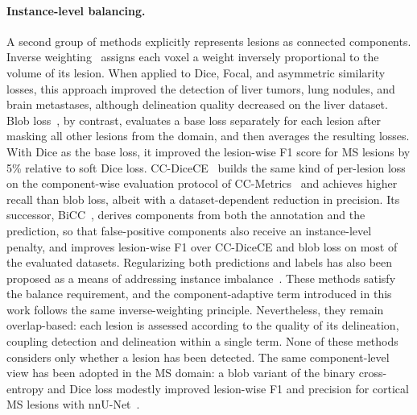 \paragraph{Instance-level balancing.}
A second group of methods explicitly represents lesions as connected
components. Inverse weighting~\cite{shirokikh_universal_2020} assigns each
voxel a weight inversely proportional to the volume of its lesion. When
applied to Dice, Focal, and asymmetric similarity losses, this approach
improved the detection of liver tumors, lung nodules, and brain metastases,
although delineation quality decreased on the liver dataset. Blob
loss~\cite{kofler_blob_2023}, by contrast, evaluates a base loss separately
for each lesion after masking all other lesions from the domain, and then
averages the resulting losses. With Dice as the base loss, it improved the
lesion-wise F1 score for MS lesions by 5\% relative to soft Dice loss.
CC-DiceCE~\cite{bouteille_learning_2026} builds the same kind of
per-lesion loss on the component-wise evaluation protocol of
CC-Metrics~\cite{jaus_every_2025} and achieves higher recall than blob loss,
albeit with a dataset-dependent reduction in precision. Its successor,
BiCC~\cite{bouteille_bicc_2026}, derives components from both the
annotation and the prediction, so that false-positive components also
receive an instance-level penalty, and improves lesion-wise F1 over
CC-DiceCE and blob loss on most of the evaluated datasets. Regularizing both
predictions and labels has also been proposed as a means of addressing
instance imbalance~\cite{aqib_javed_novel_2025}. These methods satisfy the
balance requirement, and the component-adaptive term introduced in this
work follows the same inverse-weighting principle. Nevertheless, they
remain overlap-based: each lesion is assessed according to the quality of
its delineation, coupling detection and delineation within a single term.
None of these methods considers only whether a lesion has been detected.
The same component-level view has been adopted in the MS domain: a blob
variant of the binary cross-entropy and Dice loss modestly improved
lesion-wise F1 and precision for cortical MS lesions with
nnU-Net~\cite{molchanova_benchmarking_2025}.

